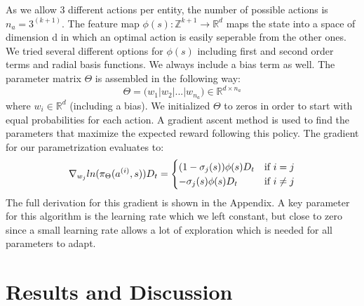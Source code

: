\documentclass[journal, a4paper]{IEEEtran}
\theoremstyle{plain}
\theoremstyle{definition}
\begin{document}
As we allow 3 different actions per entity, the number of possible actions is $n_a = 3^{(k+1)}$. 
The feature map $\phi(s): \mathbb{Z}^{k+1} \rightarrow \mathbb{R}^{d}$ maps the state into a space of dimension d in which an optimal action is easily seperable from the other ones. We tried several different options for $\phi(s)$ including first and second order terms and radial basis functions. We always include a bias term as well.
The parameter matrix $\Theta$ is assembled in the following way:
\begin{equation}
	\Theta = \big(w_1|w_2|...|w_{n_a}\big) \in \mathbb{R}^{d \times n_a }
\end{equation}
where $w_i \in \mathbb{R}^{d}$ (including a bias). We initialized $\Theta$ to zeros in order to start with equal probabilities for each action.
\newline
A gradient ascent method is used to find the parameters that maximize the expected reward following this policy. The gradient for our parametrization evaluates to:
\begin{equation}
\notag
\nabla_{w_j} ln(\pi_\Theta(a^{(i)},s))D_t=
	\begin{cases}
     (1-\sigma_j(s)) \phi(s)D_t  & \text{if $i = j$} \\
     -\sigma_j(s)\phi(s)  D_t & \text{if $i \neq  j$} \\ 
    \end{cases}
\end{equation}
The full derivation for this gradient is shown in the Appendix.\newline
A key parameter for this algorithm is the learning rate which we left constant, but close to zero since a small learning rate allows a lot of exploration which is needed for all parameters to adapt. 
\section{Results and Discussion}
\label{sec:results}
\end{document}

